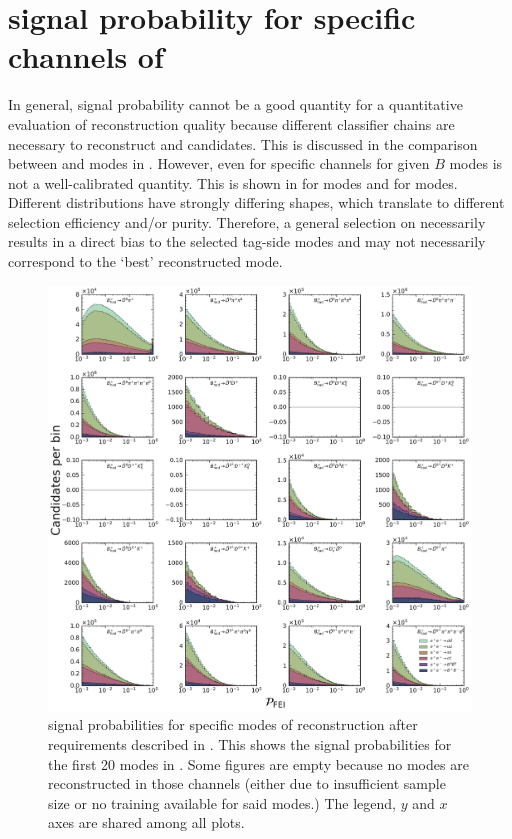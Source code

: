 \chapter{\texorpdfstring{\FEI}{FEI} signal probability for specific channels of \texorpdfstring{\B}{B}}\label{sec:appendix_fei_signal_probabilities}

In general, \FEI signal probability cannot be a good quantity for a quantitative evaluation of reconstruction quality because different classifier chains are necessary to reconstruct \Bp and \Bz candidates.
This is discussed in the comparison between \feiBp and \feiBz modes in .
However, even for specific channels for given $B$ modes \feiProb is not a well-calibrated quantity.
This is shown in  for \Bp modes and  for \Bz modes.
Different distributions have strongly differing shapes, which translate to different selection efficiency and/or purity.
Therefore, a general selection on \feiProb necessarily results in a direct bias to the 
selected tag-side modes and may not necessarily correspond to the `best' reconstructed mode.

\begin{figure}[htbp!]
    \centering
    \includegraphics[width=1\textwidth]{figures/appendices/FEI_signal_probabilities/Bp_feiSigProbs1.pdf}
    \caption{\label{fig:feisigprobs1} \FEI signal probabilities for specific modes of \Bp reconstruction after requirements described in .
    This shows the signal probabilities for the first 20 \Bp modes in .
    Some figures are empty because no modes are reconstructed in those channels (either due to insufficient sample size or no training available for said modes.)
    The legend, $y$ and $x$ axes are shared among all plots.
    }
\end{figure}


